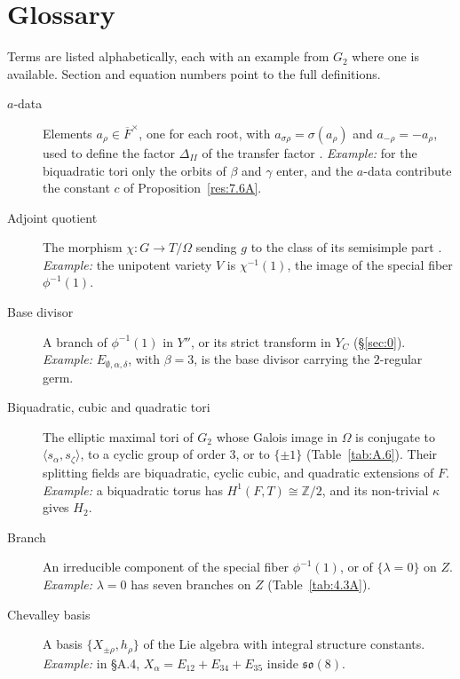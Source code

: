 \documentclass[12pt,letterpaper]{amsart}
\theoremstyle{plain}
\theoremstyle{definition}
\theoremstyle{remark}
\theoremstyle{definition}
\newcommand{\ovF}{\overline{F}}
\newcommand{\zzz}{\mathbb{Z}}
\begin{document}
\section*{Glossary}\label{sec:glossary}

Terms are listed alphabetically, each with an example from $G_2$ where one is
available. Section and equation numbers point to the full definitions.

\begin{description}
\item[$a$-data] Elements $a_\rho\in\ovF^\times$, one for each root, with
$a_{\sigma\rho}=\sigma(a_\rho)$ and $a_{-\rho}=-a_\rho$, used to define the
factor $\Delta_{II}$ of the transfer factor \cite[\S2.2]{LS87}. \emph{Example:}
for the biquadratic tori only the orbits of $\beta$ and $\gamma$ enter, and
the $a$-data contribute the constant $c$ of Proposition~\ref{res:7.6A}.

\item[Adjoint quotient] The morphism $\chi:G\to T/\Omega$ sending $g$ to the
class of its semisimple part \cite{Sl80}. \emph{Example:} the unipotent
variety $V$ is $\chi^{-1}(1)$, the image of the special fiber $\phi^{-1}(1)$.

\item[Base divisor] A branch of $\phi^{-1}(1)$ in $Y''$, or its strict
transform in $Y_C$ (\S\ref{sec:0}). \emph{Example:} $E_{\emptyset,\alpha,\delta}$,
with $\beta=3$, is the base divisor carrying the $2$-regular germ.

\item[Biquadratic, cubic and quadratic tori] The elliptic maximal tori of $G_2$
whose Galois image in $\Omega$ is conjugate to $\langle s_\alpha,s_\zeta\rangle$,
to a cyclic group of order $3$, or to $\{\pm1\}$ (Table~\ref{tab:A.6}). Their
splitting fields are biquadratic, cyclic cubic, and quadratic extensions of $F$.
\emph{Example:} a biquadratic torus has $H^1(F,T)\cong\zzz/2$, and its
non-trivial $\kappa$ gives $H_2$.

\item[Branch] An irreducible component of the special fiber $\phi^{-1}(1)$, or
of $\{\lambda=0\}$ on $Z$. \emph{Example:} $\lambda=0$ has seven branches on $Z$
(Table~\ref{tab:4.3A}).

\item[Chevalley basis] A basis $\{X_{\pm\rho},h_\rho\}$ of the Lie algebra with
integral structure constants. \emph{Example:} in \S A.4,
$X_\alpha=E_{12}+E_{34}+E_{35}$ inside $\mathfrak{so}(8)$.


\end{description}
\end{document}
